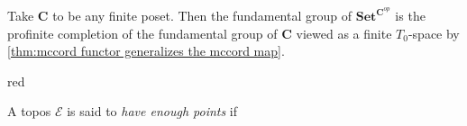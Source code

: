 \begin{example*}
Take $\mathbf{C}$ to be any finite poset. Then the fundamental group of $\mathbf{Set}^{\mathbf{C}^{op}}$ is the profinite completion of the fundamental group of $\mathbf{C}$ viewed as a finite $T_0$-space by \cref{thm:mccord functor generalizes the mccord map}.
\end{example*}

\begin{color}{red}
\begin{definition*}
A topos $\mathscr{E}$ is said to \emph{have enough points} if 
\end{definition*}
\end{color}

